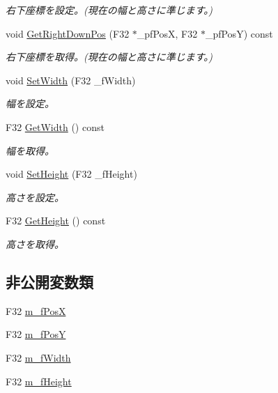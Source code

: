 \begin{DoxyCompactItemize}
\begin{DoxyCompactList}\small\item\em 右下座標を設定。(現在の幅と高さに準じます。) \end{DoxyCompactList}\item 
void \hyperlink{class_c_rect_a5ba47c13ce72dd13277728ced23fc8fe}{Get\+Right\+Down\+Pos} (F32 $\ast$\+\_\+pf\+Pos\+X, F32 $\ast$\+\_\+pf\+Pos\+Y) const 
\begin{DoxyCompactList}\small\item\em 右下座標を取得。(現在の幅と高さに準じます。) \end{DoxyCompactList}\item 
void \hyperlink{class_c_rect_aa8bf5f88199070d36ccecbeb48ab9f31}{Set\+Width} (F32 \+\_\+f\+Width)
\begin{DoxyCompactList}\small\item\em 幅を設定。 \end{DoxyCompactList}\item 
F32 \hyperlink{class_c_rect_a47d17ec52f9db4f4d2f64aa3eea7ea16}{Get\+Width} () const 
\begin{DoxyCompactList}\small\item\em 幅を取得。 \end{DoxyCompactList}\item 
void \hyperlink{class_c_rect_a6260569186759948fcd087e83b2ed406}{Set\+Height} (F32 \+\_\+f\+Height)
\begin{DoxyCompactList}\small\item\em 高さを設定。 \end{DoxyCompactList}\item 
F32 \hyperlink{class_c_rect_a85a708bf632ac0eb7e57ef77722385af}{Get\+Height} () const 
\begin{DoxyCompactList}\small\item\em 高さを取得。 \end{DoxyCompactList}\end{DoxyCompactItemize}
\subsection*{非公開変数類}
\begin{DoxyCompactItemize}
\item 
F32 \hyperlink{class_c_rect_ae2982f53e2d73b419d584c3b8705d0eb}{m\+\_\+f\+Pos\+X}
\item 
F32 \hyperlink{class_c_rect_a88b075960b04cdee33071c8fddcbe309}{m\+\_\+f\+Pos\+Y}
\item 
F32 \hyperlink{class_c_rect_acd0d44459fc57787b43b85e457db109e}{m\+\_\+f\+Width}
\item 
F32 \hyperlink{class_c_rect_aa0cd7f677bb5551c5a77ab1683e1449a}{m\+\_\+f\+Height}
\end{DoxyCompactItemize}


